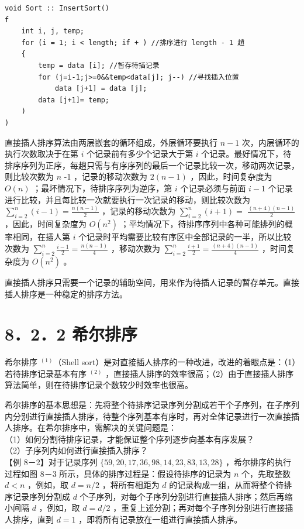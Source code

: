 \documentclass[10pt]{article}
\begin{document}
\begin{verbatim}
void Sort :: InsertSort()
f
    int i, j, temp;
    for (i = 1; i < length; if + ) //排序进行 length - 1 趟
    {
        temp = data [i]; //暂存待插记录
        for (j=i-1;j>=0&&temp<data[j]; j--) //寻找插入位置
            data [j+1] = data [j];
        data [j+1]= temp;
    )
)
\end{verbatim}

直接插人排序算法由两层嵌套的循环组成，外层循环要执行 $n-1$ 次，内层循环的执行次数取决于在第 $i$ 个记录前有多少个记录大于第 $i$ 个记录。最好情况下，待排序序列为正序，每趟只需与有序序列的最后一个记录比较一次，移动两次记录，则比较次数为 $n$ -1 ，记录的移动次数为 $2(n-1)$ ，因此，时间复杂度为 $O(n)$ ；最坏情况下，待排序序列为逆序，第 $i$ 个记录必须与前面 $i-1$ 个记录进行比较，并且每比较一次就要执行一次记录的移动，则比较次数为 $\sum_{i=2}^{n}(i-1)=\frac{n(n-1)}{2}$ ，记录的移动次数为 $\sum_{i=2}^{n}(i+1)=$ $\frac{(n+4)(n-1)}{2}$ ，因此，时间复杂度为 $O\left(n^{2}\right)$ ；平均情况下，待排序序列中各种可能排列的概率相同，在插人第 $i$ 个记录时平均需要比较有序区中全部记录的一半，所以比较次数为 $\sum_{i=2}^{n} \frac{i-1}{2}=\frac{n(n-1)}{4}$ ，移动次数为 $\sum_{i=2}^{n} \frac{i+1}{2}=\frac{(n+4)(n-1)}{4}$ ，时间复杂度为 $O\left(n^{2}\right)$ 。

直接插人排序只需要一个记录的辅助空间，用来作为待插人记录的暂存单元。直接插人排序是一种稳定的排序方法。

\section*{8．2．2 希尔排序}
希尔排序 ${ }^{(1)}$（Shell sort）是对直接插人排序的一种改进，改进的着眼点是：（1）若待排序记录基本有序 ${ }^{(2)}$ ，直接插人排序的效率很高；（2）由于直接插人排序算法简单，则在待排序记录个数较少时效率也很高。

希尔排序的基本思想是：先将整个待排序记录序列分割成若干个子序列，在子序列内分别进行直接插人排序，待整个序列基本有序时，再对全体记录进行一次直接插人排序。在希尔排序中，需解决的关键问题是：\\
（1）如何分割待排序记录，才能保证整个序列逐步向基本有序发展？\\
（2）子序列内如何进行直接插入排序？\\
【例 8－2】对于记录序列 $\{59,20,17,36,98,14,23,83,13,28\}$ ，希尔排序的执行过程如图 8－3 所示，具体的排序过程是：假设待排序的记录为 $n$ 个，先取整数 $d<n$ ，例如，取 $d=n / 2$ ，将所有相距为 $d$ 的记录构成一组，从而将整个待排序记录序列分割成 $d$ 个子序列，对每个子序列分别进行直接插人排序；然后再缩小间隔 $d$ ，例如，取 $d=d / 2$ ，重复上述分割；再对每个子序列分别进行直接插人排序，直到 $d=1$ ，即将所有记录放在一组进行直接插人排序。
\end{document}
